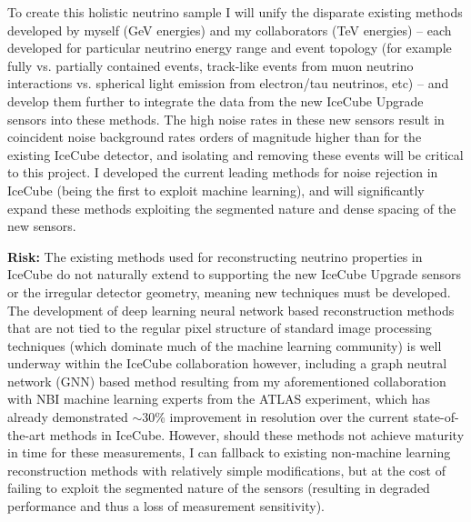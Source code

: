 \documentclass[a4paper,11pt]{article}
\begin{document}
To create this holistic neutrino sample I will unify the disparate existing methods developed by myself (GeV energies) and my collaborators (TeV energies) -- each developed for particular neutrino energy range and event topology (for example fully vs. partially contained events, track-like events from muon neutrino interactions vs. spherical light emission from electron/tau neutrinos, etc) -- and develop them further to integrate the data from the new IceCube Upgrade sensors into these methods. The high noise rates in these new sensors result in coincident noise background rates orders of magnitude higher than for the existing IceCube detector, and isolating and removing these events will be critical to this project. I developed the current leading methods for noise rejection in IceCube (being the first to exploit machine learning), and will significantly expand these methods exploiting the segmented nature and dense spacing of the new sensors.

\textbf{Risk:} The existing methods used for reconstructing neutrino properties in IceCube do not naturally extend to supporting the new IceCube Upgrade sensors or the irregular detector geometry, meaning new techniques must be developed. The development of deep learning neural network based reconstruction methods that are not tied to the regular pixel structure of standard image processing techniques (which dominate much of the machine learning community) is well underway within the IceCube collaboration however, including a graph neutral network (GNN) based method resulting from my aforementioned collaboration with NBI machine learning experts from the ATLAS experiment, which has already demonstrated $\sim$30\% improvement in resolution over the current state-of-the-art methods in IceCube. However, should these methods not achieve maturity in time for these measurements, I can fallback to existing non-machine learning reconstruction methods with relatively simple modifications, but at the cost of failing to exploit the segmented nature of the sensors (resulting in degraded performance and thus a loss of measurement sensitivity). \\

\end{document}
